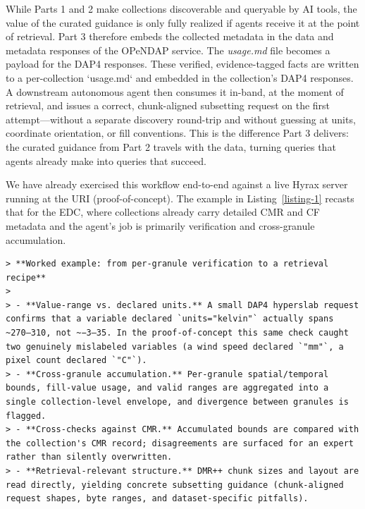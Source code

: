 \documentclass[11pt]{article}
\begin{document}
While Parts 1 and 2 make collections discoverable and queryable by \ac{AI} tools, the value of the curated guidance is only fully realized if agents receive it at the point of retrieval. Part 3 therefore embeds the collected metadata in the data and metadata responses of the \ac{OPeNDAP} service. The {\em usage.md} file becomes a payload for the \ac{DAP4} responses. These verified, evidence-tagged facts are written to a per-collection `usage.md` and embedded in the collection's \ac{DAP4} responses. A downstream autonomous agent then consumes it in-band, at the moment of retrieval, and issues a correct, chunk-aligned subsetting request on the first attempt—without a separate discovery round-trip and without guessing at units, coordinate orientation, or fill conventions. This is the difference Part 3 delivers: the curated guidance from Part 2 travels with the data, turning queries that agents already make into queries that succeed.

We have already exercised this workflow end-to-end against a live Hyrax server running at the \ac{URI} (proof-of-concept). The example in Listing~\ref{listing-1} recasts that for the \ac{EDC}, where collections already carry detailed \ac{CMR} and \ac{CF} metadata and the agent's job is primarily verification and cross-granule accumulation.

\begin{lstlisting}[caption={Proof-of-concept example run against Hyrax at the University of Rhode Island and recast for the NASA EDC}, label={listing-1}]
> **Worked example: from per-granule verification to a retrieval recipe**
>
> - **Value-range vs. declared units.** A small DAP4 hyperslab request confirms that a variable declared `units="kelvin"` actually spans ~270–310, not ~−3–35. In the proof-of-concept this same check caught two genuinely mislabeled variables (a wind speed declared `"mm"`, a pixel count declared `"C"`).
> - **Cross-granule accumulation.** Per-granule spatial/temporal bounds, fill-value usage, and valid ranges are aggregated into a single collection-level envelope, and divergence between granules is flagged.
> - **Cross-checks against CMR.** Accumulated bounds are compared with the collection's CMR record; disagreements are surfaced for an expert rather than silently overwritten.
> - **Retrieval-relevant structure.** DMR++ chunk sizes and layout are read directly, yielding concrete subsetting guidance (chunk-aligned request shapes, byte ranges, and dataset-specific pitfalls).
\end{lstlisting}
\end{document}
